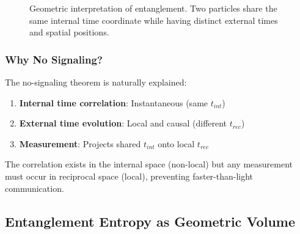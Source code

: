 \begin{figure}[htbp]
\centering
{}
\caption{Geometric interpretation of entanglement. Two particles share the same internal time coordinate while having distinct external times and spatial positions.}
\label{fig:entanglement_geometry}
\end{figure}

\subsubsection{Why No Signaling?}

The no-signaling theorem is naturally explained:

\begin{enumerate}
    \item \textbf{Internal time correlation}: Instantaneous (same $t_{int}$)
    \item \textbf{External time evolution}: Local and causal (different $t_{rec}$)
    \item \textbf{Measurement}: Projects shared $t_{int}$ onto local $t_{rec}$
\end{enumerate}

The correlation exists in the internal space (non-local) but any measurement must occur in reciprocal space (local), preventing faster-than-light communication.

\subsection{Entanglement Entropy as Geometric Volume}

